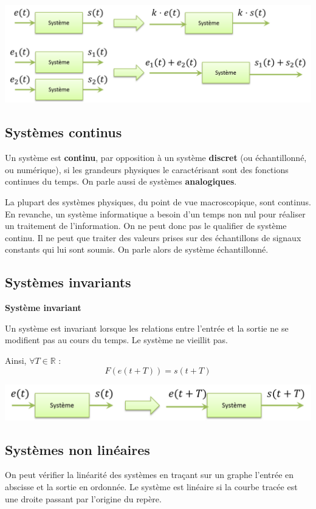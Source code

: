\documentclass[10pt,fleqn]{article} %
\begin{document}
\begin{center}
\includegraphics[width=.7\textwidth]{images/lineaire}
\end{center}

\subsection{Systèmes continus}
Un système est \textbf{continu}, par opposition à un système \textbf{discret} (ou
échantillonné, ou numérique), si les grandeurs physiques le caractérisant sont
des fonctions continues du temps. On parle aussi de systèmes
\textbf{analogiques}. 

La plupart des systèmes physiques, du point de vue macroscopique, sont
continus. En revanche, un système informatique a besoin d'un temps non nul pour
réaliser un traitement de l'information. On ne peut donc pas le qualifier de
système continu. Il ne peut que traiter des valeurs prises sur des échantillons
de signaux constants qui lui sont soumis. On parle alors de système
échantillonné.

\subsection{Systèmes invariants}
\begin{defi}
\textbf{Système invariant}

Un système est invariant lorsque les relations entre l'entrée et la sortie ne
se modifient pas au cours du temps. Le système ne vieillit pas. 

Ainsi, $\forall T \in \mathbb{R}$ :
$$
F(e(t+T))=s(t+T)
$$
\end{defi}

\begin{center}
\includegraphics[width=.7\textwidth]{images/invariant}
\end{center}

\subsection{Systèmes non linéaires}
On peut vérifier la linéarité des systèmes en traçant sur un graphe l'entrée en abscisse et la sortie en ordonnée. Le système est linéaire si la courbe tracée est une droite passant par l'origine du repère.
\end{document}
